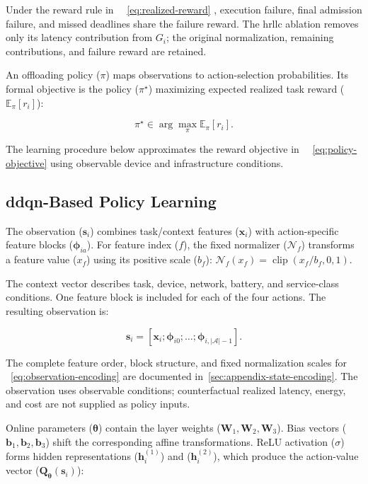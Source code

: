 \documentclass[journal]{IEEEtran}
\providecommand*{\algorithmautorefname}{Algorithm}
\providecommand*{\figureautorefname}{Figure}
\providecommand*{\subfigureautorefname}{Figure}
\providecommand*{\Autoref}[1]{%
  \begingroup
  \def\sectionautorefname{Section}%
  \def\subsectionautorefname{Subsection}%
  \def\subsubsectionautorefname{Subsubsection}%
  \def\algorithmautorefname{Algorithm}%
  \def\figureautorefname{Figure}%
  \def\subfigureautorefname{Figure}%
 ~\autoref{#1}%
  \endgroup
}
\newcommand{\Autoref}[1]{Eq.~\Autoref{#1}}
\begin{document}
Under the reward rule in~\Autoref{eq:realized-reward}, execution failure, final admission failure, and missed deadlines share the failure reward. The \acs{hrllc} ablation removes only its latency contribution from \(G_i\); the original normalization, remaining contributions, and failure reward are retained.

An offloading policy (\(\pi\)) maps observations to action-selection probabilities. Its formal objective is the policy (\(\pi^\star\)) maximizing expected realized task reward (\(\mathbb E_\pi[r_i]\)):

\begin{equation}
\label{eq:policy-objective}
\pi^\star
\in
\arg\max_\pi
\mathbb E_\pi[r_i].
\end{equation}

The learning procedure below approximates the reward objective in~\Autoref{eq:policy-objective} using observable device and infrastructure conditions.

\subsection{\texorpdfstring{\acs{ddqn}}{DDQN}-Based Policy Learning}
\label{subsec:ddqn-policy-learning}

The observation (\(\mathbf s_i\)) combines task/context features (\(\mathbf x_i\)) with action-specific feature blocks (\(\boldsymbol\phi_{ia}\)). For feature index (\(f\)), the fixed normalizer (\(\mathcal N_f\)) transforms a feature value (\(x_f\)) using its positive scale (\(b_f\)): \(\mathcal N_f(x_f)=\operatorname{clip}(x_f/b_f,0,1)\).

The context vector describes task, device, network, battery, and service-class conditions. One feature block is included for each of the four actions. The resulting observation is:

\begin{equation}
\label{eq:observation-encoding}
\mathbf s_i
=
\left[
\mathbf x_i;
\boldsymbol\phi_{i0};
\ldots;
\boldsymbol\phi_{i,|\mathcal A|-1}
\right].
\end{equation}

The complete feature order, block structure, and fixed normalization scales for~\Autoref{eq:observation-encoding} are documented in~{\def\sectionautorefname{Appendix}\autoref{sec:appendix-state-encoding}}. The observation uses observable conditions; counterfactual realized latency, energy, and cost are not supplied as policy inputs.

Online parameters (\(\boldsymbol\theta\)) contain the layer weights (\(\mathbf W_1,\mathbf W_2,\mathbf W_3\)). Bias vectors (\(\mathbf b_1,\mathbf b_2,\mathbf b_3\)) shift the corresponding affine transformations. ReLU activation (\(\sigma\)) forms hidden representations (\(\mathbf h_i^{(1)}\)) and (\(\mathbf h_i^{(2)}\)), which produce the action-value vector (\(\mathbf Q_{\boldsymbol\theta}(\mathbf s_i)\)):
\end{document}
